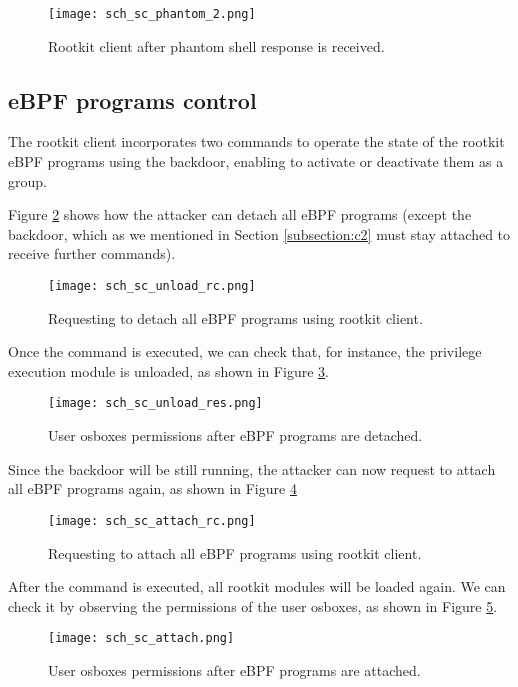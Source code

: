 \begin{figure}[htbp]
	\centering
	\texttt{[image: sch\_sc\_phantom\_2.png]}
	\caption{Rootkit client after phantom shell response is received.}
	\label{fig:sc_phantom_2}
\end{figure}



\subsection{eBPF programs control}
The rootkit client incorporates two commands to operate the state of the rootkit eBPF programs using the backdoor, enabling to activate or deactivate them as a group.

Figure \ref{fig:sc_unload_rc} shows how the attacker can detach all eBPF programs (except the backdoor, which as we mentioned in Section \ref{subsection:c2} must stay attached to receive further commands).

\begin{figure}[htbp]
	\centering
	\texttt{[image: sch\_sc\_unload\_rc.png]}
	\caption{Requesting to detach all eBPF programs using rootkit client.}
	\label{fig:sc_unload_rc}
\end{figure}

Once the command is executed, we can check that, for instance, the privilege execution module is unloaded, as shown in Figure \ref{fig:sc_unload_res}.

\begin{figure}[htbp]
	\centering
	\texttt{[image: sch\_sc\_unload\_res.png]}
	\caption{User osboxes permissions after eBPF programs are detached.}
	\label{fig:sc_unload_res}
\end{figure}

Since the backdoor will be still running, the attacker can now request to attach all eBPF programs again, as shown in Figure \ref{fig:sc_attach_rc}

\begin{figure}[htbp]
	\centering
	\texttt{[image: sch\_sc\_attach\_rc.png]}
	\caption{Requesting to attach all eBPF programs using rootkit client.}
	\label{fig:sc_attach_rc}
\end{figure}

After the command is executed, all rootkit modules will be loaded again. We can check it by observing the permissions of the user osboxes, as shown in Figure \ref{fig:sc_attach}.

\begin{figure}[htbp]
	\centering
	\texttt{[image: sch\_sc\_attach.png]}
	\caption{User osboxes permissions after eBPF programs are attached.}
	\label{fig:sc_attach}
\end{figure}


